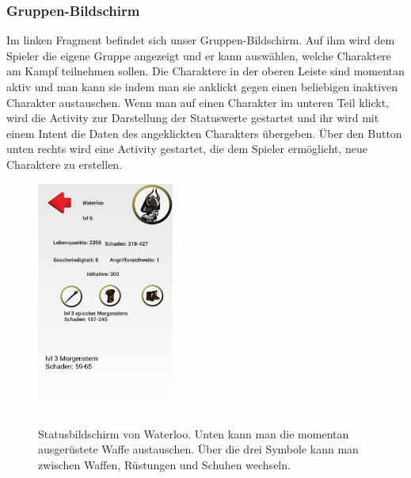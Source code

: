 \documentclass[extern,palatino]{cgBA}
\begin{document}
\subsubsection{Gruppen-Bildschirm}
Im linken Fragment befindet sich unser Gruppen-Bildschirm. Auf ihm wird dem Spieler die eigene Gruppe angezeigt und er kann auswählen, welche Charaktere am Kampf teilnehmen sollen. Die Charaktere in der oberen Leiste sind momentan aktiv und man kann sie indem man sie anklickt gegen einen beliebigen inaktiven Charakter austauschen.
Wenn man auf einen Charakter im unteren Teil klickt, wird die Activity zur Darstellung der Statuswerte gestartet und ihr wird mit einem Intent die Daten des angeklickten Charakters übergeben. Über den Button unten rechts wird eine Activity gestartet, die dem Spieler ermöglicht, neue Charaktere zu erstellen.
\newpage
\begin{figure}[H] 
		\centering
		\includegraphics[width=0.4\textwidth]{statscreen.png}
		\caption{Statusbildschirm von Waterloo. Unten kann man die momentan ausgerüstete Waffe austauschen. Über die drei Symbole kann man zwischen Waffen, Rüstungen und Schuhen wechseln.}
		\label{fig:Bild4}
\end{figure} 
\end{document}
